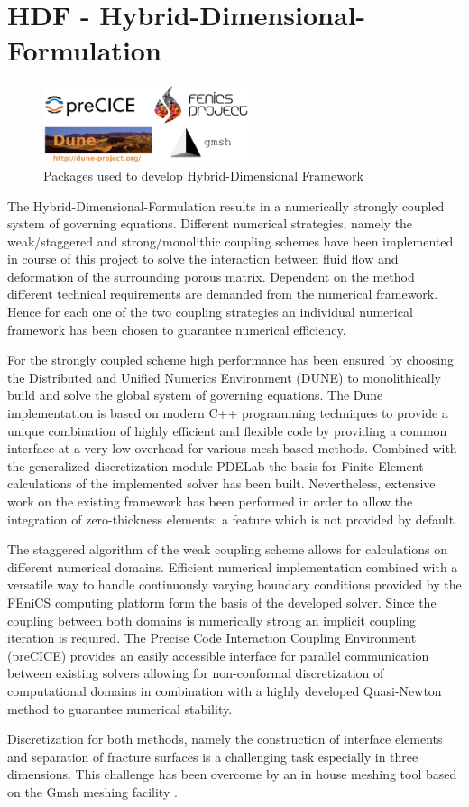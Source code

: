 \section{HDF - Hybrid-Dimensional-Formulation}
\begin{figure}
  \centering
  \includegraphics[width=6cm]{figures/0a_hdf_packages.png}
  \caption{Packages used to develop Hybrid-Dimensional Framework}
  \label{fig:hdf_packages}
\end{figure}
The Hybrid-Dimensional-Formulation results in a numerically strongly coupled system of governing equations. Different numerical strategies, namely the weak/staggered and strong/monolithic coupling schemes have been implemented in course of this project to solve the interaction between fluid flow and deformation of the surrounding porous matrix. Dependent on the method different technical requirements are demanded from the numerical framework. Hence for each one of the two coupling strategies an individual numerical framework has been chosen to guarantee numerical efficiency.

For the strongly coupled scheme high performance has been ensured by choosing the Distributed and Unified Numerics Environment (DUNE) \cite{dune24:16} to monolithically build and solve the global system of governing equations. The Dune implementation is based on modern C++ programming techniques to provide a unique combination of highly efficient and flexible code by providing a common interface at a very low overhead for various mesh based methods. Combined with the generalized discretization module PDELab \cite{dune:pdelab} the basis for Finite Element calculations of the implemented solver has been built. Nevertheless, extensive work on the existing framework has been performed in order to allow the integration of zero-thickness elements; a feature which is not provided by default.

The staggered algorithm of the weak coupling scheme allows for calculations on different numerical domains. Efficient numerical implementation combined with a versatile way to handle continuously varying boundary conditions provided by the FEniCS computing platform \cite{AlnaesBlechta2015a} form the basis of the developed solver. Since the coupling between both domains is numerically strong an implicit coupling iteration is required. The Precise Code Interaction Coupling Environment (preCICE) \cite{preCICE} provides an easily accessible interface for parallel communication between existing solvers allowing for non-conformal discretization of computational domains in combination with a highly developed Quasi-Newton method to guarantee numerical stability.

Discretization for both methods, namely the construction of interface elements and separation of fracture surfaces is a challenging task especially in three dimensions. This challenge has been overcome by an in house meshing tool based on the Gmsh meshing facility \cite{doi:10.1002/nme.2579}.
